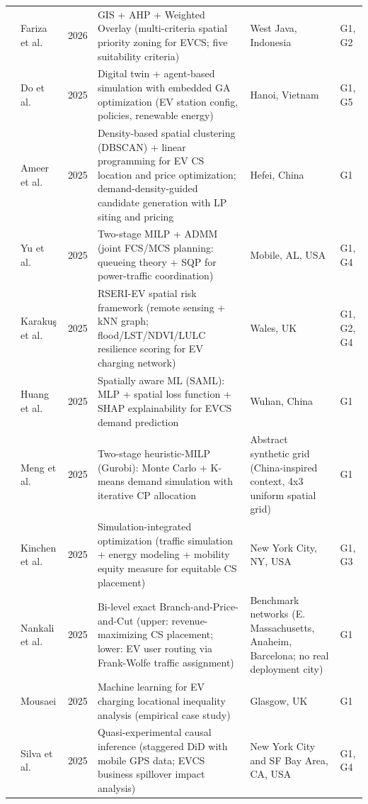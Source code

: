 \documentclass[letterpaper, 12pt, oneside, doublespacing]{Thesis}
\begin{document}
\begin{longtable}{L{0.9cm} L{2.2cm} L{0.8cm} L{3.3cm} L{2.5cm} L{1.5cm}}
\cite{strategic_planning_2026} & Fariza et al. & 2026 & GIS + AHP + Weighted Overlay (multi-criteria spatial priority zoning for EVCS; five suitability criteria) & West Java, Indonesia & G1, G2 \\
\cite{a_2025} & Do et al. & 2025 & Digital twin + agent-based simulation with embedded GA optimization (EV station config, policies, renewable energy) & Hanoi, Vietnam & G1, G5 \\
\cite{a_density-based_2025} & Ameer et al. & 2025 & Density-based spatial clustering (DBSCAN) + linear programming for EV CS location and price optimization; demand-density-guided candidate generation with LP siting and pricing & Hefei, China & G1 \\
\cite{a_joint_2025} & Yu et al. & 2025 & Two-stage MILP + ADMM (joint FCS/MCS planning: queueing theory + SQP for power-traffic coordination) & Mobile, AL, USA & G1, G4 \\
\cite{a_multi-modal_2025} & Karaku\c{s} et al. & 2025 & RSERI-EV spatial risk framework (remote sensing + kNN graph; flood/LST/NDVI/LULC resilience scoring for EV charging network) & Wales, UK & G1, G2, G4 \\
\cite{a_spatially_2025} & Huang et al. & 2025 & Spatially aware ML (SAML): MLP + spatial loss function + SHAP explainability for EVCS demand prediction & Wuhan, China & G1 \\
\cite{a_two-stage_2025} & Meng et al. & 2025 & Two-stage heuristic-MILP (Gurobi): Monte Carlo + K-means demand simulation with iterative CP allocation & Abstract synthetic grid (China-inspired context, 4x3 uniform spatial grid) & G1 \\
\cite{a_united_2025} & Kinchen et al. & 2025 & Simulation-integrated optimization (traffic simulation + energy modeling + mobility equity measure for equitable CS placement) & New York City, NY, USA & G1, G3 \\
\cite{an_exact_2025} & Nankali et al. & 2025 & Bi-level exact Branch-and-Price-and-Cut (upper: revenue-maximizing CS placement; lower: EV user routing via Frank-Wolfe traffic assignment) & Benchmark networks (E. Massachusetts, Anaheim, Barcelona; no real deployment city) & G1 \\
\cite{analyzing_locational_2025} & Mousaei & 2025 & Machine learning for EV charging locational inequality analysis (empirical case study) & Glasgow, UK & G1 \\
\cite{causal_spillover_2025} & Silva et al. & 2025 & Quasi-experimental causal inference (staggered DiD with mobile GPS data; EVCS business spillover impact analysis) & New York City and SF Bay Area, CA, USA & G1, G4 \\

\end{longtable}
\end{document}
